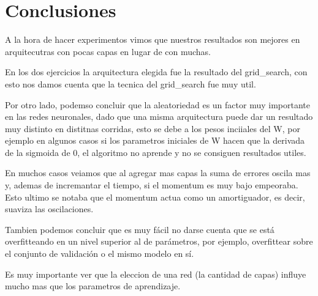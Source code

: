 \section{Conclusiones}
A la hora de hacer experimentos vimos que nuestros resultados son mejores en arquitecutras con pocas capas en lugar de con muchas.

En los dos ejercicios la arquitectura elegida fue la resultado del grid\_search, con esto nos damos cuenta que la tecnica del grid\_search fue muy util.

Por otro lado, podemso concluir que la aleatoriedad es un factor muy importante en las redes neuronales, dado que una misma arquitectura puede dar un resultado muy distinto en distitnas corridas, esto se debe a los pesos inciiales del W, por ejemplo en algunos casos si los parametros iniciales de W hacen que la derivada de la sigmoida de 0, el algoritmo no aprende y no se consiguen resultados utiles.

En muchos casos veiamos que al agregar mas capas la suma de errores oscila mas y, ademas de incremantar el tiempo, si el momentum es muy bajo empeoraba. Esto ultimo se notaba que el momentum actua como un amortiguador, es decir, suaviza las oscilaciones.

Tambien podemos concluir que es muy fácil no darse cuenta que se está overfitteando en un nivel superior al de parámetros, por ejemplo, overfittear sobre el conjunto de validación o el mismo modelo en sí.

Es muy importante ver que la eleccion de una red (la cantidad de capas) influye mucho mas que los parametros de aprendizaje.

